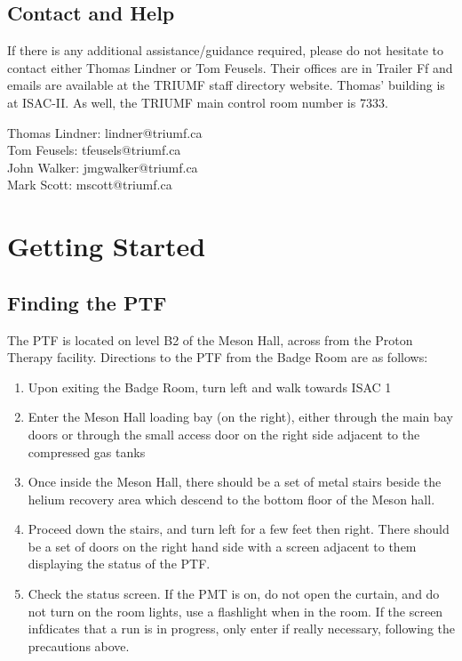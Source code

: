 \documentclass[twoside,letterpaper]{refart}
\begin{document}
\subsection{Contact and Help}

If there is any additional assistance/guidance required, please do not hesitate to contact either Thomas Lindner or Tom Feusels. Their offices are in Trailer Ff and emails are available at the TRIUMF staff directory website. Thomas' building is at ISAC-II. As well, the TRIUMF main control room number is 7333. 

Thomas Lindner: lindner@triumf.ca\\
Tom Feusels: tfeusels@triumf.ca\\
John Walker: jmgwalker@triumf.ca\\
Mark Scott: mscott@triumf.ca

\newpage

\section{Getting Started}

\subsection{Finding the PTF}

The PTF is located on level B2 of the Meson Hall, across from the Proton Therapy facility.  Directions to the PTF from the Badge Room are as follows:

\begin{enumerate}
	\item Upon exiting the Badge Room, turn left and walk towards ISAC 1
	\item Enter the Meson Hall loading bay (on the right), either through the main bay doors or through the small access door on the right side adjacent to the compressed gas tanks
	\item Once inside the Meson Hall, there should be a set of metal stairs beside the helium recovery area which descend to the bottom floor of the Meson hall. 
	\item Proceed down the stairs, and turn left for a few feet then right.  There should be a set of doors on the right hand side with a screen adjacent to them displaying the status of the PTF.
	\item Check the status screen. If the PMT is on, do not open the curtain, and do not turn on the room lights, use a flashlight when in the room. If the screen infdicates that a run is in progress, only enter if really necessary, following the precautions above.
\end{enumerate}
\end{document}
